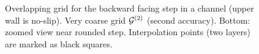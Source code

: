 {
\begin{figure}[hbt]
\newcommand{\figWidth}{16cm}
\newcommand{\trimfig}[2]{\trimFigb{#1}{#2}{0.01}{.01}{.275}{.275}}
\newcommand{\figWidtha}{5.5cm}
\newcommand{\trimfiga}[2]{\trimFigb{#1}{#2}{0.0}{.0}{.0}{.0}}
\begin{center}\small
\caption{
Overlapping grid for the backward facing step in a channel (upper wall is no-slip). Very coarse grid ${\mathcal G}^{(2)}$ (second accuracy). Bottom: zoomed view near rounded step.
Interpolation points (two layers) are marked as black squares.
}
\label{fig:backStepInChannelGrid}
\end{center}
\end{figure}
}

